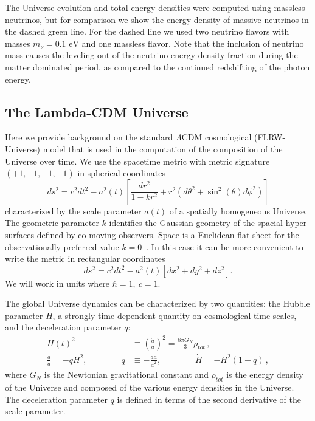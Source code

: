 \documentclass[universe,article,submit,moreauthors,pdftex,a4paper]{Definitions/mdpi}
\newcommand{\eV}{\text{ eV}}
\newcommand{\beqn}{\begin{equation}}
\newcommand{\eeqn}{\end{equation}}
\begin{document}
The Universe evolution and total energy densities were computed using massless neutrinos, but for comparison we show the energy density of massive neutrinos in the dashed green line. For the dashed line we used two neutrino flavors with masses $m_\nu=0.1\eV$ and one massless flavor. Note that the inclusion of neutrino mass causes the leveling out of the neutrino energy density fraction during the matter dominated period, as compared to the continued redshifting of the photon energy.

\subsection{The Lambda-CDM Universe}\label{sec:Cosmo}
\noindent Here we provide background on the standard $\Lambda$CDM cosmological (FLRW-Universe) model that is used in the computation of the composition of the Universe over time. We use the spacetime metric with metric signature $(+1,-1,-1,-1)$ in spherical coordinates
\beqn\label{metric}
ds^2=c^2dt^2-a^2(t)\left[ \frac{dr^2}{1-kr^2}+r^2(d\theta^2+\sin^2(\theta)d\phi^2)\right]
\eeqn
characterized by the scale parameter $a(t)$ of a spatially homogeneous Universe. The geometric parameter $k$ identifies the Gaussian geometry of the spacial hyper-surfaces defined by co-moving observers. Space is a Euclidean flat-sheet for the observationally preferred value $k=0$~\cite{Planck:2013pxb,Planck:2015fie,Planck:2018vyg}. In this case it can be more convenient to write the metric in rectangular coordinates
\beqn\label{metric2}
ds^2=c^2dt^2-a^2(t)\left[ dx^2+dy^2+dz^2\right].
\eeqn
We will work in units where $\hbar=1,\ c=1$.

The global Universe dynamics can be characterized by two quantities: the Hubble parameter $H$, a strongly time dependent quantity on cosmological time scales, and the deceleration parameter $q$:
\begin{align}
 \label{Hubble} H(t)^{2}&\equiv\left(\frac{\dot a}{a}\right)^2=\frac{8\pi G_{N}}{3}\rho_{tot}\,,\\
 \label{Deceleration} \frac{\ddot a}{a}=-qH^2,\qquad\qquad q&\equiv -\frac{a\ddot a}{\dot a^2},\qquad\qquad \dot H=-H^2(1+q)\,, 
\end{align}
where $G_{N}$ is the Newtonian gravitational constant and $\rho_{tot}$ is the energy density of the Universe and composed of the various energy densities in the Universe. The deceleration parameter $q$ is defined in terms of the second derivative of the scale parameter. 
\end{document}
